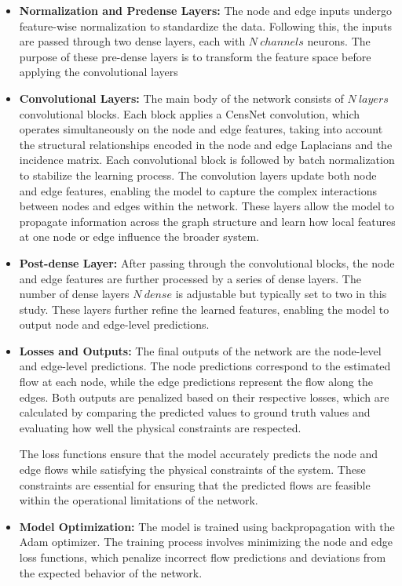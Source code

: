 \begin{itemize}
    \item \textbf{Normalization and Pre\-dense Layers:} The node and edge inputs undergo feature-wise normalization to standardize the data. Following this, the inputs are passed through two dense layers, each with $N \ channels$ neurons. The purpose of these pre-dense layers is to transform the feature space before applying the convolutional layers 
    \item \textbf{Convolutional Layers:} The main body of the network consists of $N \ layers$ convolutional blocks. Each block applies a CensNet convolution, which operates simultaneously on the node and edge features, taking into account the structural relationships encoded in the node and edge Laplacians and the incidence matrix. Each convolutional block is followed by batch normalization to stabilize the learning process. 
 The convolution layers update both node and edge features, enabling the model to capture the complex interactions between nodes and edges within the network. These layers allow the model to propagate information across the graph structure and learn how local features at one node or edge influence the broader system.   
    \item \textbf{Post-dense Layer:} After passing through the convolutional blocks, the node and edge features are further processed by a series of dense layers. The number of dense layers $N \ dense$ is adjustable but typically set to two in this study. These layers further refine the learned features, enabling the model to output node and edge-level predictions. 
    \item \textbf{Losses and Outputs:} The final outputs of the network are the node-level and edge-level predictions. The node predictions correspond to the estimated flow at each node, while the edge predictions represent the flow along the edges. Both outputs are penalized based on their respective losses, which are calculated by comparing the predicted values to ground truth values and evaluating how well the physical constraints are respected.

The loss functions ensure that the model accurately predicts the node and edge flows while satisfying the physical constraints of the system. These constraints are essential for ensuring that the predicted flows are feasible within the operational limitations of the network. 
    \item \textbf{Model Optimization:} The model is trained using backpropagation with the Adam optimizer. The training process involves minimizing the node and edge loss functions, which penalize incorrect flow predictions and deviations from the expected behavior of the network.

\begin{figure}
    \centering
    \setlength{}        
    \setlength{}
    \resizebox{\figurewidth}{\figureheight}{}
    \caption{}\label{fig:}
\end{figure}
\end{itemize}


